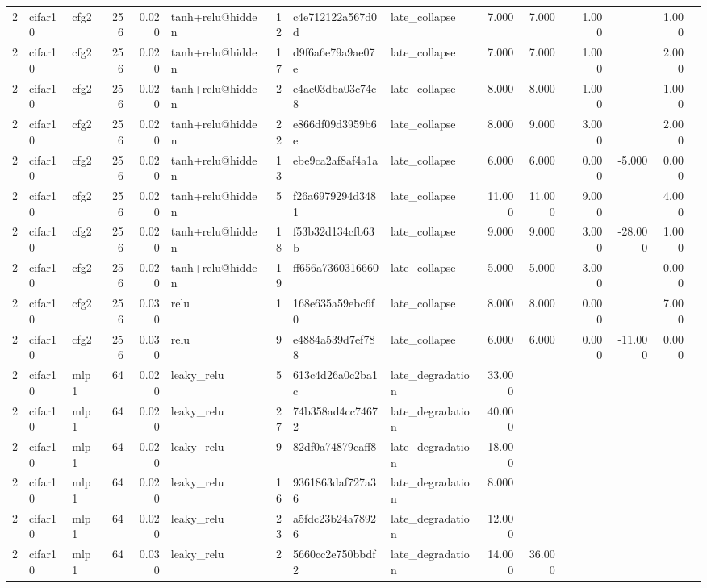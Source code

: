 \begin{table}[htbp]
{\begin{tabular}{@{}rllrrlrllrrrrrrr@{}}
2 & cifar10 & cfg2 & 256 & 0.020 & tanh+relu@hidden & 12 & c4e712122a567d0d & late\_collapse & 7.000 & 7.000 &  & 1.000 &  & 1.000 &  \\
2 & cifar10 & cfg2 & 256 & 0.020 & tanh+relu@hidden & 17 & d9f6a6e79a9ae07e & late\_collapse & 7.000 & 7.000 &  & 1.000 &  & 2.000 &  \\
2 & cifar10 & cfg2 & 256 & 0.020 & tanh+relu@hidden & 2 & e4ae03dba03c74c8 & late\_collapse & 8.000 & 8.000 &  & 1.000 &  & 1.000 &  \\
2 & cifar10 & cfg2 & 256 & 0.020 & tanh+relu@hidden & 22 & e866df09d3959b6e & late\_collapse & 8.000 & 9.000 &  & 3.000 &  & 2.000 &  \\
2 & cifar10 & cfg2 & 256 & 0.020 & tanh+relu@hidden & 13 & ebe9ca2af8af4a1a & late\_collapse & 6.000 & 6.000 &  & 0.000 & -5.000 & 0.000 &  \\
2 & cifar10 & cfg2 & 256 & 0.020 & tanh+relu@hidden & 5 & f26a6979294d3481 & late\_collapse & 11.000 & 11.000 &  & 9.000 &  & 4.000 &  \\
2 & cifar10 & cfg2 & 256 & 0.020 & tanh+relu@hidden & 18 & f53b32d134cfb63b & late\_collapse & 9.000 & 9.000 &  & 3.000 & -28.000 & 1.000 &  \\
2 & cifar10 & cfg2 & 256 & 0.020 & tanh+relu@hidden & 19 & ff656a7360316660 & late\_collapse & 5.000 & 5.000 &  & 3.000 &  & 0.000 &  \\
2 & cifar10 & cfg2 & 256 & 0.030 & relu & 1 & 168e635a59ebc6f0 & late\_collapse & 8.000 & 8.000 &  & 0.000 &  & 7.000 &  \\
2 & cifar10 & cfg2 & 256 & 0.030 & relu & 9 & e4884a539d7ef788 & late\_collapse & 6.000 & 6.000 &  & 0.000 & -11.000 & 0.000 &  \\
2 & cifar10 & mlp1 & 64 & 0.020 & leaky\_relu & 5 & 613c4d26a0c2ba1c & late\_degradation & 33.000 &  &  &  &  &  &  \\
2 & cifar10 & mlp1 & 64 & 0.020 & leaky\_relu & 27 & 74b358ad4cc74672 & late\_degradation & 40.000 &  &  &  &  &  &  \\
2 & cifar10 & mlp1 & 64 & 0.020 & leaky\_relu & 9 & 82df0a74879caff8 & late\_degradation & 18.000 &  &  &  &  &  &  \\
2 & cifar10 & mlp1 & 64 & 0.020 & leaky\_relu & 16 & 9361863daf727a36 & late\_degradation & 8.000 &  &  &  &  &  &  \\
2 & cifar10 & mlp1 & 64 & 0.020 & leaky\_relu & 23 & a5fdc23b24a78926 & late\_degradation & 12.000 &  &  &  &  &  &  \\
2 & cifar10 & mlp1 & 64 & 0.030 & leaky\_relu & 2 & 5660cc2e750bbdf2 & late\_degradation & 14.000 & 36.000 &  &  &  &  &  \\

\end{tabular}}
\end{table}
